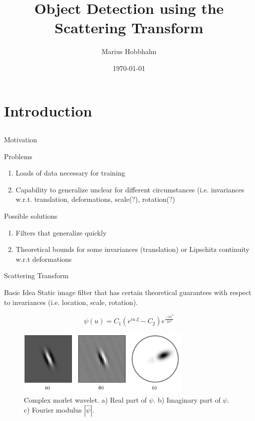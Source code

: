 \documentclass[compress]{beamer}
\title[BA Hobbhahn 2019]{Object Detection using the Scattering Transform}
\author{Marius Hobbhahn}
\date{\today}
\begin{document}
	
	\begin{frame}
		\titlepage
	\end{frame}
	\section{Introduction}
	\subsection{ } %
	\begin{frame}{Motivation}
		\begin{block}{Problems}
			\begin{enumerate}
				\item Loads of data necessary for training
				\item Capability to generalize unclear for different circumstances (i.e. invariances w.r.t. translation, deformations, scale(?), rotation(?)
			\end{enumerate}
		\end{block}
		\begin{block}{Possible solutions}
			\begin{enumerate}
				\item Filters that generalize quickly
				\item Theoretical bounds for some invariances (translation) or Lipschitz continuity w.r.t deformations
			\end{enumerate}
		\end{block}
	\end{frame}
	\begin{frame}{Scattering Transform}
		\begin{block}{Basic Idea}
			Static image filter that has certain theoretical guarantees with respect to invariances (i.e. location, scale, rotation).
		\end{block}
		\begin{equation}
		\psi(u) = C_1 (e^{iu.\xi} - C_2) e^{\frac{-|u|^2}{2\sigma^2}}
		\label{eq:morlet2d}
		\end{equation}
		\begin{figure}[!htb]
			\centering
			\includegraphics[width = 0.75\textwidth]{images/morlet2d.png}
			\caption{Complex morlet wavelet. a) Real part of $\psi$. b) Imaginary part of $\psi$. c) Fourier modulus $|\hat{\psi}|$.}
			\label{fig:morlet2d}
		\end{figure}
	\end{frame}
\end{document}
